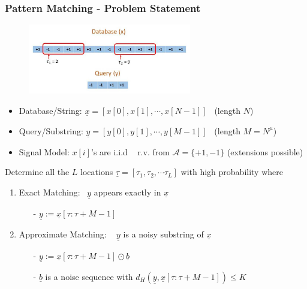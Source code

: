 \documentclass[10pt,xcolor=table]{beamer}
\newcommand{\xv}{\underline{x}}
\newcommand{\bv}{\underline{b}}
\newcommand{\yv}{\underline{y}}
\begin{document}
\begin{frame}\frametitle{Pattern Matching - Problem Statement}
 	\vspace{-0.4cm}
	\begin{figure}[t]
		\centering
		\includegraphics[width=2.8in]{Pattern_matching_ex.pdf}
	\end{figure}
	\vspace{-10pt}
	\begin{block}{}
\begin{itemize}\itemsep5pt
	\item {\color{blue} Database/String}: $\xv = [x[0], x[1], \cdots, x[N-1]]$ \ (length $N$)
	\item { \color{blue} Query/Substring}: $\yv = [y[0], y[1], \cdots, y[M-1]]$ \ (length $M = N^\mu$)
	\item {\color{blue} Signal Model:} $x[i]$'s are i.i.d ~ r.v. from $\mathcal{A} = \{+1,-1\}$ (extensions possible)
\end{itemize}
\end{block}

\vspace{-3pt}
\pause
\begin{block}{}
Determine all the {\color{blue} $L$ locations} $\underline{\tau} = [\tau_1, \tau_2, \cdots \tau_L]$ with  {\color{blue}high probability}  where
	\begin{enumerate}
		\item \alert{Exact Matching}:~  $\yv$ appears {\color{blue}exactly} in $\xv$
		\begin{itemize}
				\item [-]  $\yv := \xv[\tau:\tau+M-1]$
		\end{itemize}
        \pause
		\item \alert{Approximate Matching:} ~ $\yv$ is a {\color{blue}noisy substring} of $\xv$
		\begin{itemize}\itemsep3pt
				\item [-] $\yv := \xv[\tau:\tau+M-1] \odot \bv$
				\item [-] $\bv$ is a noise sequence with $d_H(\yv,\xv[\tau:\tau+M-1]) \leq K$
		\end{itemize}
	\end{enumerate}

	\end{block}
	 \end{frame}
\end{document}
